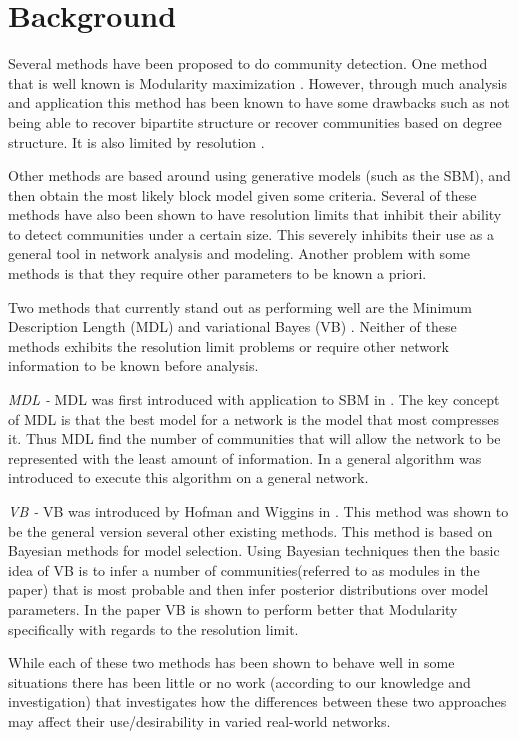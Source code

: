 \documentclass[twocolumn,twoside]{IEEEtran}
\begin{document}
\section*{Background}\label{sec:Background} Several methods have been proposed
to do community detection. One method that is well known is Modularity
maximization \cite{Newman2004}. However, through much analysis and application
this method has been known to have some drawbacks such as not being able to
recover bipartite structure \cite{Peixoto2013} or recover communities based on
degree structure. It is also limited by resolution 
\cite{fortunato2007resolution}.

Other methods are based around using generative models (such as the SBM), and
then obtain the most likely block model given some criteria. Several of these
methods have also been shown to have resolution
limits\cite{fortunato2007resolution} that inhibit their ability to detect
communities under a certain size. This severely inhibits their use as a general
tool in network analysis and modeling. Another problem with some methods is
that they require other parameters to be known a priori.

Two methods that currently stand out as performing well are the Minimum
Description Length (MDL) \cite{Peixoto2013} and variational Bayes (VB)
\cite{Hofman2008}. Neither of these methods exhibits the resolution limit
problems or require other network information to be known before analysis.

\emph{MDL - } MDL was first introduced with application to SBM in
\cite{Rosvall2007}. The key concept of MDL is that the best model for a network
is the model that most compresses it. Thus MDL find the number of communities
that will allow the network to be represented with the least amount of
information. In \cite{Peixoto2013} a general algorithm was introduced to
execute this algorithm on a general network.

\emph{VB - } VB was introduced by Hofman and Wiggins in \cite{Hofman2008}. This
method was shown to be the general version several other existing methods.
This method is based on Bayesian methods for model selection. Using Bayesian
techniques then the basic idea of VB is to infer a number of
communities(referred to as modules in the paper) that is most probable and then
infer posterior distributions over model parameters. In the paper VB is shown
to perform better that Modularity specifically with regards to the resolution
limit.

While each of these two methods has been shown to behave well in some
situations there has been little or no work (according to our knowledge and
investigation) that investigates how the differences between these two
approaches may affect their use/desirability in varied real-world networks.
\end{document}
